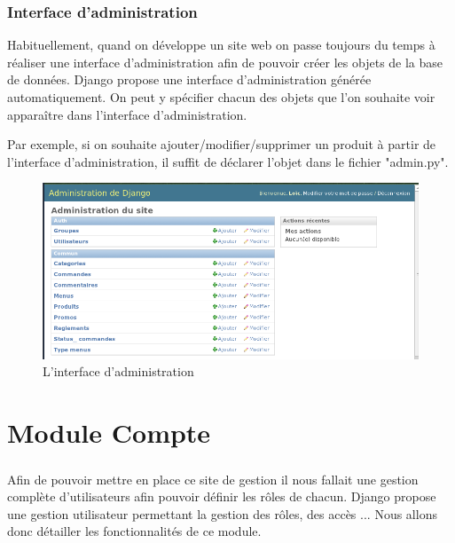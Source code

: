 \documentclass[twoside,UTF8]{EPURapport}
\begin{document}
    \subsection{Interface d'administration}
Habituellement, quand on développe un site web on passe toujours du temps à réaliser une interface d'administration afin de pouvoir créer les objets de la base de données. Django propose une interface d'administration générée automatiquement. On peut y spécifier chacun des objets que l'on souhaite voir apparaître dans l'interface d'administration.

Par exemple, si on souhaite ajouter/modifier/supprimer un produit à partir de l'interface d'administration, il suffit de déclarer l'objet dans le fichier "admin.py".

\begin{figure}[H]
    \centering
    \includegraphics[width=\linewidth]{./logos/admin.png}
    \caption{L'interface d'administration}
\end{figure}

\chapter{Module Compte}

    \paragraph{}Afin de pouvoir mettre en place ce site de gestion il nous fallait une gestion complète d'utilisateurs afin pouvoir définir les rôles de chacun. Django propose une gestion utilisateur permettant la gestion des rôles, des accès ... Nous allons donc détailler les fonctionnalités de ce module.
\end{document}
